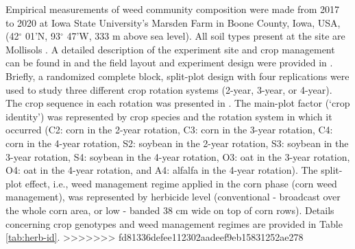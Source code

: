 \documentclass[
]{article}
\begin{document}
Empirical measurements of weed community composition were made from 2017 to 2020 at Iowa State University's Marsden Farm in Boone County, Iowa, USA, (42\(^\circ\) 01'N, 93\(^\circ\) 47'W, 333 m above sea level). All soil types present at the site are Mollisols \citep{chenInfluenceResidueNitrogen2014}. A detailed description of the experiment site and crop management can be found in \citet{liebmanWeedSeedbankDiversity2021} and the field layout and experiment design were provided in \citet{nguyenImpactCroppingSysteminreview}. Briefly, a randomized complete block, split-plot design with four replications were used to study three different crop rotation systems (2-year, 3-year, or 4-year). The crop sequence in each rotation was presented in \citet{nguyenImpactCroppingSysteminreview}. The main-plot factor (`crop identity') was represented by crop species and the rotation system in which it occurred (C2: corn in the 2-year rotation, C3: corn in the 3-year rotation, C4: corn in the 4-year rotation, S2: soybean in the 2-year rotation, S3: soybean in the 3-year rotation, S4: soybean in the 4-year rotation, O3: oat in the 3-year rotation, O4: oat in the 4-year rotation, and A4: alfalfa in the 4-year rotation). The split-plot effect, i.e., weed management regime applied in the corn phase (corn weed management), was represented by herbicide level (conventional - broadcast over the whole corn area, or low - banded 38 cm wide on top of corn rows). Details concerning crop genotypes and weed management regimes are provided in Table \ref{tab:herb-id}.
\textgreater\textgreater\textgreater\textgreater\textgreater\textgreater\textgreater{} fd81336defee112302aadeef9eb15831252ae278
\end{document}
